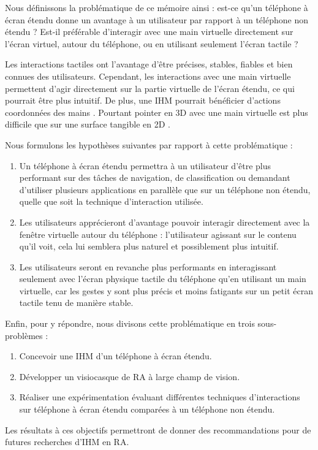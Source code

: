 Nous définissons la problématique de ce mémoire ainsi : est-ce qu'un téléphone à écran étendu donne un avantage à un utilisateur par rapport à un téléphone non étendu ? Est-il préférable d'interagir avec une main virtuelle directement sur l'écran virtuel, autour du téléphone, ou en utilisant seulement l'écran tactile ?

Les interactions tactiles ont l'avantage d'être précises, stables, fiables et bien connues des utilisateurs. Cependant, les interactions avec une main virtuelle permettent d'agir directement sur la partie virtuelle de l'écran étendu, ce qui pourrait être plus intuitif. De plus, une IHM pourrait bénéficier d'actions coordonnées des mains \citep{White2009}. Pourtant pointer en 3D avec une main virtuelle est plus difficile que sur une surface tangible en 2D \citep{Argelaguet2013}.

Nous formulons les hypothèses suivantes par rapport à cette problématique :
\begin{enumerate}[label={(H\arabic*)}]
  \item Un téléphone à écran étendu permettra à un utilisateur d'être plus performant sur des tâches de navigation, de classification ou demandant d'utiliser plusieurs applications en parallèle que sur un téléphone non étendu, quelle que soit la technique d'interaction utilisée.
  \item Les utilisateurs apprécieront d'avantage pouvoir interagir directement avec la fenêtre virtuelle autour du téléphone : l'utilisateur agissant sur le contenu qu'il voit, cela lui semblera plus naturel et possiblement plus intuitif.
  \item Les utilisateurs seront en revanche plus performants en interagissant seulement avec l'écran physique tactile du téléphone qu'en utilisant un main virtuelle, car les gestes y sont plus précis et moins fatigants sur un petit écran tactile tenu de manière stable.
\end{enumerate}
\medskip
 
Enfin, pour y répondre, nous divisons cette problématique en trois sous-problèmes :
\begin{enumerate}
  \item Concevoir une IHM d'un téléphone à écran étendu.
  \item Développer un visiocasque de RA à large champ de vision.
  \item Réaliser une expérimentation évaluant différentes techniques d'interactions sur téléphone à écran étendu comparées à un téléphone non étendu.
\end{enumerate}
\medskip

Les résultats à ces objectifs permettront de donner des recommandations pour de futures recherches d'IHM en RA.